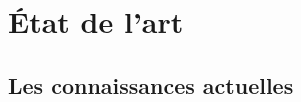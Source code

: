 
  \section{État de l'art}

    \subsection{Les connaissances actuelles}\label{sec::current_knowledge}

